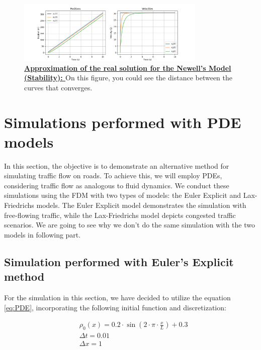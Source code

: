\documentclass{article}
\begin{document}
	 
	 \begin{figure}[H]
	 	\centering
	 	\includegraphics[width=0.8\textwidth]{RealSol1.png}
	 	\caption[Approximation of the real solution for the Newell's Model (Stability)]{\textbf{\underline{Approximation of the real solution for the Newell's Model (Stability): }} On this figure, you could see the distance between the curves that converges.}
	 	\label{fig:SE5}
	 \end{figure}
	
	
	
	\section{Simulations performed with PDE models}
	
	In this section, the objective is to demonstrate an alternative method for simulating traffic flow on roads. To achieve this, we will employ PDEs, considering traffic flow as analogous to fluid dynamics. We conduct these simulations using the FDM with two types of models: the Euler Explicit and Lax-Friedrichs models. The Euler Explicit model demonstrates the simulation with free-flowing traffic, while the Lax-Friedrichs model depicts congested traffic scenarios. We are going to see why we don't do the same simulation with the two models in following part.
	
	
	\subsection{Simulation performed with Euler's Explicit method}
	
	For the simulation in this section, we have decided to utilize the equation \ref{eq:PDE}, incorporating the following initial function and discretization:
	
	\[
	\boxed{
		\begin{aligned}
			&\rho_0(x)=0.2 \cdot \sin\left(2 \cdot \pi \cdot \frac{x}{L}\right) + 0.3 \\
			&\Delta t = 0.01 \\
			&\Delta x = 1
		\end{aligned}
	}
	\]
	
\end{document}
